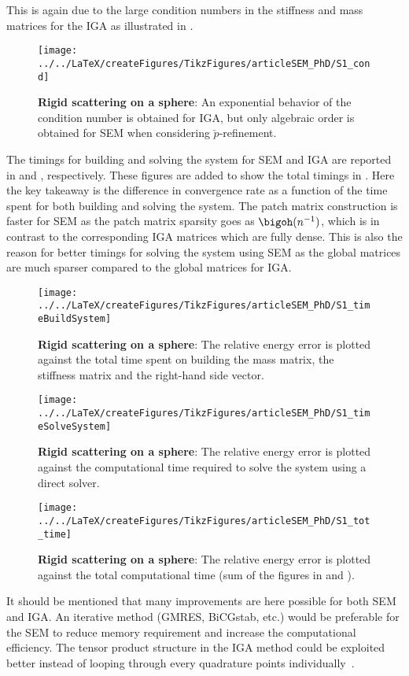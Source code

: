 This is again due to the large condition numbers in the stiffness and mass matrices for the IGA as illustrated in . 
\begin{figure}
	\centering
	\texttt{[image: ../../LaTeX/createFigures/TikzFigures/articleSEM\_PhD/S1\_cond]}
	\caption{\textbf{Rigid scattering on a sphere}: An exponential behavior of the condition number is obtained for IGA, but only algebraic order is obtained for SEM when considering $\check{p}$-refinement. }
	\label{Fig5:S1_cond}
\end{figure}


The timings for building and solving the system for SEM and IGA are reported in  and , respectively. These figures are added to show the total timings in . Here the key takeaway is the difference in convergence rate as a function of the time spent for both building and solving the system. The patch matrix construction is faster for SEM as the patch matrix sparsity goes as $\bigoh(n^{-1})$, which is in contrast to the corresponding IGA matrices which are fully dense. This is also the reason for better timings for solving the system using SEM as the global matrices are much sparser compared to the global matrices for IGA.
\begin{figure}
	\centering
	\texttt{[image: ../../LaTeX/createFigures/TikzFigures/articleSEM\_PhD/S1\_timeBuildSystem]}
	\caption{\textbf{Rigid scattering on a sphere}: The relative energy error is plotted against the total time spent on building the mass matrix, the stiffness matrix and the right-hand side vector.}
	\label{Fig5:S1_timeBuildSystem}
\end{figure}
\begin{figure}
	\centering
	\texttt{[image: ../../LaTeX/createFigures/TikzFigures/articleSEM\_PhD/S1\_timeSolveSystem]}
	\caption{\textbf{Rigid scattering on a sphere}: The relative energy error is plotted against the computational time required to solve the system using a direct solver.}
	\label{Fig5:S1_timeSolveSystem}
\end{figure}
\begin{figure}
	\centering
	\texttt{[image: ../../LaTeX/createFigures/TikzFigures/articleSEM\_PhD/S1\_tot\_time]}
	\caption{\textbf{Rigid scattering on a sphere}: The relative energy error is plotted against the total computational time (sum of the figures in  and ).}
	\label{Fig5:S1_tot_time}
\end{figure}

It should be mentioned that many improvements are here possible for both SEM and IGA. An iterative method (GMRES, BiCGstab, etc.) would be preferable for the SEM to reduce memory requirement and increase the computational efficiency. The tensor product structure in the IGA method could be exploited better instead of looping through every quadrature points individually~\cite{Antolin2015emc}.